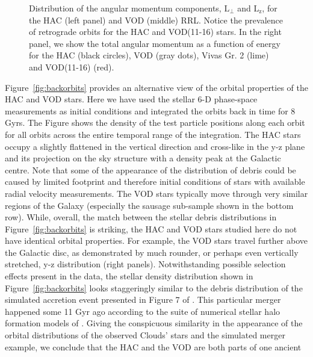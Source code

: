\documentclass[a4paper,useAMS,usenatbib]{mnras}
\begin{document}
\begin{figure}
		       	       	       	       \vspace{-0.46cm}
   \caption{Distribution of the angular momentum components,
     $\mathrm{L_{\perp}}$ and $\mathrm{L_{z}}$, for the HAC (left
     panel) and VOD (middle) RRL. Notice the prevalence of
     retrograde orbits for the HAC and VOD(11-16) stars. In the right
     panel, we show the total angular momentum as a function of energy
     for the HAC (black circles), VOD (gray dots), Vivas Gr. 2  (lime) and VOD(11-16) (red).} %
    \label{fig:energy}
\end{figure}
%

Figure~\ref{fig:backorbits} provides an alternative view of the
orbital properties of the HAC and VOD stars. Here we have used the
stellar 6-D phase-space measurements as initial conditions and
integrated the orbits back in time for 8 Gyrs. The Figure shows the
density of the test particle positions along each orbit for all orbits
across the entire temporal range of the integration. The HAC stars
occupy a slightly flattened in the vertical direction and cross-like in
the y-z plane and its projection on the sky structure
with a density peak at the Galactic centre. Note that some of the
appearance of the distribution of debris could be caused by limited
footprint and therefore initial conditions of stars with available radial velocity
measurements. The VOD stars typically move through very similar
regions of the Galaxy (especially the sausage sub-sample shown in the
bottom row). While, overall, the match between the stellar debris
distributions in Figure~\ref{fig:backorbits} is striking, the HAC and
VOD stars studied here do not have identical orbital properties. For
example, the VOD stars travel further above the Galactic disc, as
demonstrated by much rounder, or perhaps even vertically stretched, y-z
distribution (right panels).
%
Notwithstanding possible selection effects present in the data, the
stellar density distribution shown in Figure~\ref{fig:backorbits}
looks staggeringly similar to the debris distribution of the simulated
accretion event presented in Figure 7 of \citet{Simion2018}. This
particular merger happened some 11 Gyr ago according to the suite of
numerical stellar halo formation models of \citet{Bu05}. Giving the
conspicuous similarity in the appearance of the orbital distributions
of the observed Clouds' stars and the simulated merger example, we
conclude that the HAC and the VOD are both parts of one ancient
\end{document}
